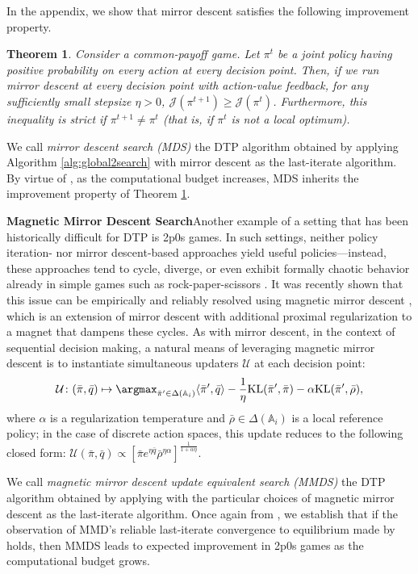 \documentclass{article} %
\theoremstyle{plain}
\newtheorem{theorem}{Theorem}[section]
\theoremstyle{definition}
\theoremstyle{remark}
\begin{document}
In the appendix, we show that mirror descent satisfies the following improvement property.

\begin{theorem} \label{thm:md}
Consider a common-payoff game. Let $\pi^t$ be a joint policy having positive probability on every action at every decision point.
Then, if we run mirror descent at every decision point with action-value feedback, for any sufficiently small stepsize $\eta > 0$,
$\mathcal{J}(\pi^{t+1}) \geq \mathcal{J}(\pi^t)$.
Furthermore, this inequality is strict if $\pi^{t+1} \neq \pi^t$ (that is, if $\pi^t$ is not a local optimum).
\end{theorem}

We call \emph{mirror descent search (MDS)} the DTP algorithm obtained by applying Algorithm \ref{alg:global2search} with mirror descent as the last-iterate algorithm. 
By virtue of , as the computational budget increases, MDS inherits the improvement property of Theorem \ref{thm:md}.

\textbf{Magnetic Mirror Descent Search}\quad Another example of a setting that has been historically difficult for DTP is 2p0s games.
In such settings, neither policy iteration- nor mirror descent-based approaches yield useful policies---instead, these approaches tend to cycle, diverge, or even exhibit formally chaotic behavior already in simple games such as rock-paper-scissors \citep{cheung2019vortices}.
It was recently shown that this issue can be empirically and reliably resolved using magnetic mirror descent \citep{mmd}, which is an extension of mirror descent with additional proximal regularization to a magnet that dampens these cycles.
As with mirror descent, in the context of sequential decision making,
a natural means of leveraging magnetic mirror descent is to instantiate simultaneous updaters $\mathcal{U}$ at each decision point:
\[\mathcal{U} \colon (\bar{\pi}, \bar{q}) \mapsto \argmax_{\bar{\pi}' \in \Delta(\mathbb{A}_i)} \langle \bar{\pi}', \bar{q} \rangle - \frac{1}{\eta} \text{KL}(\bar{\pi}', \bar{\pi}) - \alpha  \text{KL}(\bar{\pi}', \bar{\rho}),\]
where $\alpha$ is a regularization temperature and $\bar{\rho} \in \Delta(\mathbb{A}_i)$ is a local reference policy; in the case of discrete action spaces, this update reduces to the following closed form:
$\mathcal{U} (\bar{\pi}, \bar{q}) \propto [\bar{\pi} e^{\eta \bar{q}} \bar{\rho}^{\eta \alpha}]^{\frac{1}{1 + \alpha \eta}}$.

We call \textit{magnetic mirror descent update equivalent search (MMDS)} the DTP algorithm obtained by applying  with the particular choices of magnetic mirror descent as the last-iterate algorithm.
Once again from , we establish that if the observation of MMD's reliable last-iterate convergence to equilibrium made by \citet{mmd} holds, then MMDS leads to expected improvement in 2p0s games as the computational budget grows.
\end{document}
